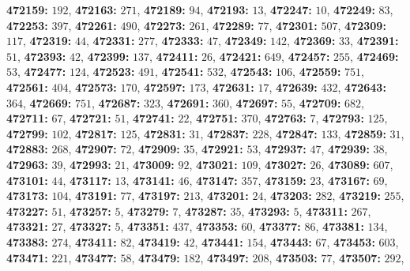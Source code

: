 \textsf{\bfseries 472159:} $192$, \textsf{\bfseries 472163:} $271$, \textsf{\bfseries 472189:} $94$, \textsf{\bfseries 472193:} $13$, \textsf{\bfseries 472247:} $10$, \textsf{\bfseries 472249:} $83$, \textsf{\bfseries 472253:} $397$, \textsf{\bfseries 472261:} $490$, \textsf{\bfseries 472273:} $261$, \textsf{\bfseries 472289:} $77$, \textsf{\bfseries 472301:} $507$, \textsf{\bfseries 472309:} $117$, \textsf{\bfseries 472319:} $44$, \textsf{\bfseries 472331:} $277$, \textsf{\bfseries 472333:} $47$, \textsf{\bfseries 472349:} $142$, \textsf{\bfseries 472369:} $33$, \textsf{\bfseries 472391:} $51$, \textsf{\bfseries 472393:} $42$, \textsf{\bfseries 472399:} $137$, \textsf{\bfseries 472411:} $26$, \textsf{\bfseries 472421:} $649$, \textsf{\bfseries 472457:} $255$, \textsf{\bfseries 472469:} $53$, \textsf{\bfseries 472477:} $124$, \textsf{\bfseries 472523:} $491$, \textsf{\bfseries 472541:} $532$, \textsf{\bfseries 472543:} $106$, \textsf{\bfseries 472559:} $751$, \textsf{\bfseries 472561:} $404$, \textsf{\bfseries 472573:} $170$, \textsf{\bfseries 472597:} $173$, \textsf{\bfseries 472631:} $17$, \textsf{\bfseries 472639:} $432$, \textsf{\bfseries 472643:} $364$, \textsf{\bfseries 472669:} $751$, \textsf{\bfseries 472687:} $323$, \textsf{\bfseries 472691:} $360$, \textsf{\bfseries 472697:} $55$, \textsf{\bfseries 472709:} $682$, \textsf{\bfseries 472711:} $67$, \textsf{\bfseries 472721:} $51$, \textsf{\bfseries 472741:} $22$, \textsf{\bfseries 472751:} $370$, \textsf{\bfseries 472763:} $7$, \textsf{\bfseries 472793:} $125$, \textsf{\bfseries 472799:} $102$, \textsf{\bfseries 472817:} $125$, \textsf{\bfseries 472831:} $31$, \textsf{\bfseries 472837:} $228$, \textsf{\bfseries 472847:} $133$, \textsf{\bfseries 472859:} $31$, \textsf{\bfseries 472883:} $268$, \textsf{\bfseries 472907:} $72$, \textsf{\bfseries 472909:} $35$, \textsf{\bfseries 472921:} $53$, \textsf{\bfseries 472937:} $47$, \textsf{\bfseries 472939:} $38$, \textsf{\bfseries 472963:} $39$, \textsf{\bfseries 472993:} $21$, \textsf{\bfseries 473009:} $92$, \textsf{\bfseries 473021:} $109$, \textsf{\bfseries 473027:} $26$, \textsf{\bfseries 473089:} $607$, \textsf{\bfseries 473101:} $44$, \textsf{\bfseries 473117:} $13$, \textsf{\bfseries 473141:} $46$, \textsf{\bfseries 473147:} $357$, \textsf{\bfseries 473159:} $23$, \textsf{\bfseries 473167:} $69$, \textsf{\bfseries 473173:} $104$, \textsf{\bfseries 473191:} $77$, \textsf{\bfseries 473197:} $213$, \textsf{\bfseries 473201:} $24$, \textsf{\bfseries 473203:} $282$, \textsf{\bfseries 473219:} $255$, \textsf{\bfseries 473227:} $51$, \textsf{\bfseries 473257:} $5$, \textsf{\bfseries 473279:} $7$, \textsf{\bfseries 473287:} $35$, \textsf{\bfseries 473293:} $5$, \textsf{\bfseries 473311:} $267$, \textsf{\bfseries 473321:} $27$, \textsf{\bfseries 473327:} $5$, \textsf{\bfseries 473351:} $437$, \textsf{\bfseries 473353:} $60$, \textsf{\bfseries 473377:} $86$, \textsf{\bfseries 473381:} $134$, \textsf{\bfseries 473383:} $274$, \textsf{\bfseries 473411:} $82$, \textsf{\bfseries 473419:} $42$, \textsf{\bfseries 473441:} $154$, \textsf{\bfseries 473443:} $67$, \textsf{\bfseries 473453:} $603$, \textsf{\bfseries 473471:} $221$, \textsf{\bfseries 473477:} $58$, \textsf{\bfseries 473479:} $182$, \textsf{\bfseries 473497:} $208$, \textsf{\bfseries 473503:} $77$, \textsf{\bfseries 473507:} $292$, 
